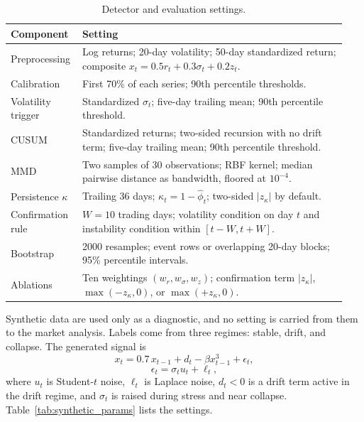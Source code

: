 \documentclass[pdflatex,sn-mathphys-num,iicol]{sn-jnl}
\begin{document}
\begin{appendices}
\begin{table}[t]
\centering
\caption{Detector and evaluation settings.}
\label{tab:hyperparams}
\scriptsize
\begin{tabular}{p{0.18\linewidth}p{0.76\linewidth}}
\toprule
Component & Setting \\
\midrule
Preprocessing & Log returns; 20-day volatility; 50-day standardized return; composite $x_t=0.5r_t+0.3\sigma_t+0.2z_t$.\\
Calibration & First 70\% of each series; 90th percentile thresholds.\\
Volatility trigger & Standardized $\sigma_t$; five-day trailing mean; 90th percentile threshold.\\
CUSUM & Standardized returns; two-sided recursion with no drift term; five-day trailing mean; 90th percentile threshold.\\
MMD & Two samples of 30 observations; RBF kernel; median pairwise distance as bandwidth, floored at $10^{-4}$.\\
Persistence $\kappa$ & Trailing 36 days; $\kappa_t=1-\widehat\phi_t$; two-sided $|z_\kappa|$ by default.\\
Confirmation rule & $W=10$ trading days; volatility condition on day $t$ and instability condition within $[t-W,t+W]$.\\
Bootstrap & 2000 resamples; event rows or overlapping 20-day blocks; 95\% percentile intervals.\\
Ablations & Ten weightings $(w_r,w_\sigma,w_z)$; confirmation term $|z_\kappa|$, $\max(-z_\kappa,0)$, or $\max(+z_\kappa,0)$.\\
\bottomrule
\end{tabular}
\end{table}

Synthetic data are used only as a diagnostic, and no setting is carried from them to the market analysis. Labels come from three regimes: stable, drift, and collapse. The generated signal is
\begin{equation}
x_t=0.7\,x_{t-1}+d_t-\beta x_{t-1}^{3}+\epsilon_t,
\end{equation}
\begin{equation}
\epsilon_t=\sigma_t u_t+\ell_t,
\end{equation}
where $u_t$ is Student-$t$ noise, $\ell_t$ is Laplace noise, $d_t<0$ is a drift term active in the drift regime, and $\sigma_t$ is raised during stress and near collapse. Table~\ref{tab:synthetic_params} lists the settings.


\end{appendices}
\end{document}
